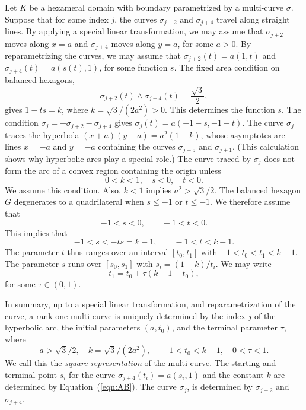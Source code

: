 \documentclass[11pt]{amsart}
\def\ta{{\tau}}
\begin{document}
Let $K$ be a hexameral domain with boundary parametrized by a multi-curve $\sigma$.
Suppose that for some index $j$, the curves $\sigma_{j+2}$ and $\sigma_{j+4}$ travel along straight lines.
By applying a special linear transformation, we may assume that $\sigma_{j+2}$ moves along
$x=a$ and $\sigma_{j+4}$ moves along $y=a$, for some $a>0$.  
By reparametrizing the curves, we may assume
that $\sigma_{j+2}(t) = a(1,t)$ and $\sigma_{j+4}(t) = a(s(t),1)$, for some function $s$.  The fixed area condition 
on balanced hexagons, 
\begin{equation}
{\sigma_{j+2}(t)}\land{\sigma_{j+4}(t)}=\frac{\sqrt{3}}2,
\end{equation}
gives $1- t s = k$, where $k=\sqrt3/(2a^2) > 0$.  This determines the function $s$.  The condition $\sigma_{j} = -\sigma_{j+2} -\sigma_{j+4}$
gives $\sigma_{j}(t) = a (-1-s,-1-t)$.  The curve $\sigma_{j}$ 
traces the hyperbola $(x+a)(y+a) = a^2(1-k)$,
whose asymptotes are lines $x=-a$ and $y=-a$ containing the curves $\sigma_{j+5}$ and $\sigma_{j+1}$.
(This calculation shows why hyperbolic arcs play a special role.)
The curve traced by $\sigma_{j}$ does not form the arc of a convex region containing the origin unless
   \begin{equation}
   0 < k < 1,\quad s<0,\quad t < 0.
   \end{equation}
We assume this condition.
Also, $k<1$ implies $a^2 > \sqrt3/2$.  The balanced hexagon $G$ degenerates
to a quadrilateral when $s \le -1$ or $t\le -1$.  We therefore assume
that 
\begin{equation}
-1<s < 0,\qquad -1 < t < 0.
\end{equation}
  This implies that
\begin{equation}
-1 < s < -t s = k-1,\qquad -1 < t < k-1.
\end{equation}  
The parameter $t$ thus ranges
over an interval $[t_0,t_1]$ with $-1 < t_0 < t_1 < k-1$.  The parameter
$s$ runs over $[s_0,s_1]$ with $s_i = (1-k)/t_i$.  We may
write 
\begin{equation}
t_1 = t_0 + \ta (k-1-t_0),
\end{equation}
for some $\ta\in (0,1)$.

In summary, up to a special linear transformation, and reparametrization of the curve, a rank one multi-curve is uniquely determined by the index $j$ of the hyperbolic arc,
the initial parameters $(a,t_0)$, and the terminal parameter $\ta$, where
  \begin{equation}\label{eqn:atu}
  a > \sqrt{3}/2,\quad  k = \sqrt{3}/(2a^2),\quad -1 < t_0 < k - 1,
  \quad 0 < \ta < 1.
  \end{equation}
We call this the {\it square representation} of the multi-curve.
The starting and terminal point $s_i$ for the curve $\sigma_{j+4}(t_i) = a(s_i,1)$ and the constant $k$ are determined by Equation~(\ref{eqn:AB}).  The curve $\sigma_{j}$, is determined by $\sigma_{j+2}$ and $\sigma_{j+4}$. 
\end{document}
